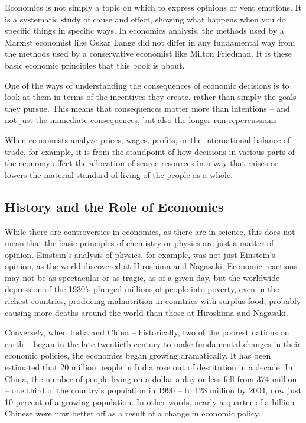 Economics is not simply a topic on which to express opinions or vent emotions. It is a systematic study of cause and effect, showing what happens when you do specific things in specific ways. In economics analysis, the methods used by a Marxist economist like Oskar Lange did not differ in any fundamental way from the methods used by a conservative economist like Milton Friedman. It is these basic economic principles that this book is about.

One of the ways of understanding the consequences of economic decisions is to look at them in terms of the incentives they create, rather than simply the goals they pursue. This means that consequences matter more than intentions – and not just the immediate consequences, but also the longer run repercussions 

When economists analyze prices, wages, profits, or the international balance of trade, for example, it is from the standpoint of how decisions in various parts of the economy affect the allocation of scarce resources in a way that raises or lowers the material standard of living of the people as a whole.

\subsection{History and the Role of Economics}

While there are controversies in economics, as there are in science, this does not mean that the basic principles of chemistry or physics are just a matter of opinion. Einstein’s analysis of physics, for example, was not just Einstein’s opinion, as the world discovered at Hiroshima and Nagasaki. Economic reactions may not be as spectacular or as tragic, as of a given day, but the worldwide depression of the 1930’s plunged millions of people into poverty, even in the richest countries, producing malnutrition in countries with surplus food, probably causing more deaths around the world than those at Hiroshima and Nagasaki.

Conversely, when India and China – historically, two of the poorest nations on earth – began in the late twentieth century to make fundamental changes in their economic policies, the economies began growing dramatically. It has been estimated that 20 million people in India rose out of destitution in a decade. In China, the number of people living on a dollar a day or less fell from 374 million – one third of the country’s population in 1990 – to 128 million by 2004, now just 10 percent of a growing population. In other words, nearly a quarter of a billion Chinese were now better off as a result of a change in economic policy.

